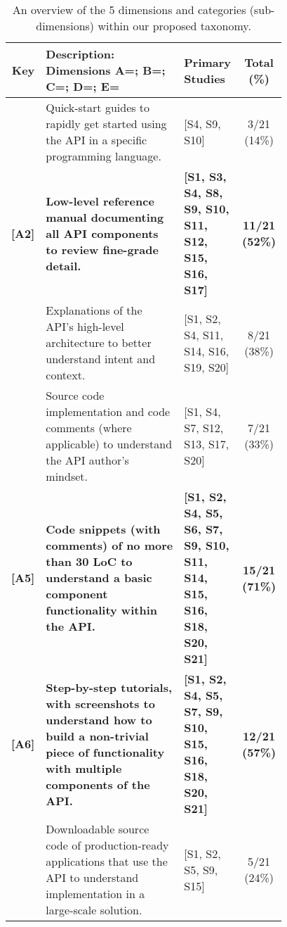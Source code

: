 

\def\cn{}
\def\cy{\checkmark}

\begin{table*}[hbt]
  \caption{An overview of the 5 dimensions and categories (sub-dimensions) within our proposed taxonomy.}
  \label{tab:taxonomy}
  \begin{tabular}{|rp{0.58\linewidth}||p{0.2\linewidth}|c|}
    \hline

    \textbf{Key} &
    \textbf{Description: Dimensions A=\dima{}; B=\dimb{}; C=\dimc{}; D=\dimd{}; E=\dime{}} &
    \textbf{Primary Studies } &
    \textbf{Total (\%)} \\

    \hline
    \hline
    [A1]&
    Quick-start guides to rapidly get started using the API in a specific programming language.
    &
    [S4, S9, S10] &
    3/21 (14\%)\\

    \hline
    \textbf{[A2]}&
    \textbf{Low-level reference manual documenting all API components to review fine-grade detail.}
    &
    \textbf{[S1, S3, S4, S8, S9, S10, S11, S12, S15, S16, S17]} &
    \textbf{11/21 (52\%)}\\

    \hline
    [A3]&
    Explanations of the API's high-level architecture to better understand intent and context.
    &
    [S1, S2, S4, S11, S14, S16, S19, S20] &
    8/21 (38\%)\\

    \hline
    [A4]&
    Source code implementation and code comments (where applicable) to understand the API author's mindset.
    &
    [S1, S4, S7, S12, S13, S17, S20] &
    7/21 (33\%)\\

    \hline
    \textbf{[A5]}&
    \textbf{Code snippets (with comments) of no more than 30 LoC to understand a basic component functionality within the API.}
    &
    \textbf{[S1, S2, S4, S5, S6, S7, S9, S10, S11, S14, S15, S16, S18, S20, S21]} &
    \textbf{15/21 (71\%)}\\

    \hline
    \textbf{[A6]}&
    \textbf{Step-by-step tutorials, with screenshots to understand  how to build a non-trivial piece of functionality with multiple components of the API.}
    &
    \textbf{[S1, S2, S4, S5, S7, S9, S10, S15, S16, S18, S20, S21]} &
    \textbf{12/21 (57\%)}\\

    \hline
    [A7]&
    Downloadable source code of production-ready applications that use the API to understand implementation in a large-scale solution.
    &
    [S1, S2, S5, S9, S15] &
    5/21 (24\%)\\


\end{tabular}
\end{table*}
